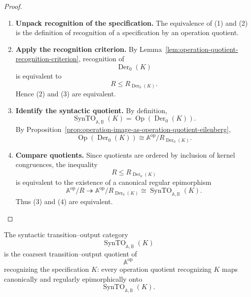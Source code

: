 \begin{proof}
    \leavevmode
    \begin{enumerate}
        \item \textbf{Unpack recognition of the specification.}
        The equivalence of (1) and (2) is the definition of recognition of a
        specification by an operation quotient.

        \item \textbf{Apply the recognition criterion.}
        By Lemma~\ref{lem:operation-quotient-recognition-criterion},
        recognition of
        \[
            \operatorname{Der}_0(K)
        \]
        is equivalent to
        \[
            R\leq R_{\operatorname{Der}_0(K)}.
        \]
        Hence (2) and (3) are equivalent.

        \item \textbf{Identify the syntactic quotient.}
        By definition,
        \[
            \operatorname{SynTO}_{\mathbb A,\mathbb B}(K)
            =
            \operatorname{Op}(\operatorname{Der}_0(K)).
        \]
        By Proposition~\ref{prop:operation-image-as-operation-quotient-eilenberg},
        \[
            \operatorname{Op}(\operatorname{Der}_0(K))
            \cong
            \mathbb A^{\mathrm{op}}/
            R_{\operatorname{Der}_0(K)}.
        \]

        \item \textbf{Compare quotients.}
        Since quotients are ordered by inclusion of kernel congruences, the
        inequality
        \[
            R\leq R_{\operatorname{Der}_0(K)}
        \]
        is equivalent to the existence of a canonical regular epimorphism
        \[
            \mathbb A^{\mathrm{op}}/R
            \twoheadrightarrow
            \mathbb A^{\mathrm{op}}/
            R_{\operatorname{Der}_0(K)}
            \cong
            \operatorname{SynTO}_{\mathbb A,\mathbb B}(K).
        \]
        Thus (3) and (4) are equivalent.
    \end{enumerate}
\end{proof}

\begin{corollary}
\label{cor:syntactic-transition-output-quotient}
    The syntactic transition--output category
    \[
        \operatorname{SynTO}_{\mathbb A,\mathbb B}(K)
    \]
    is the coarsest transition--output quotient of
    \[
        \mathbb A^{\mathrm{op}}
    \]
    recognizing the specification \(K\): every operation quotient recognizing
    \(K\) maps canonically and regularly epimorphically onto
    \[
        \operatorname{SynTO}_{\mathbb A,\mathbb B}(K).
    \]
\end{corollary}

